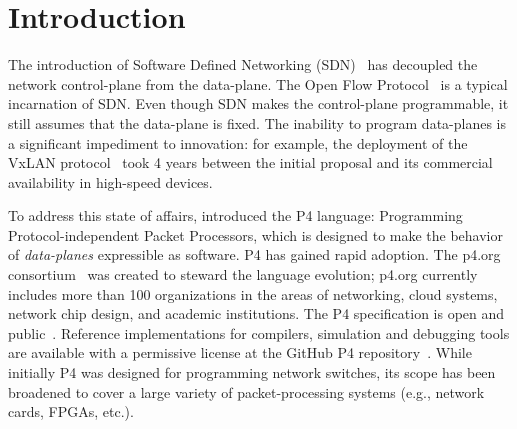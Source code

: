  \section{Introduction}\label{sec:introduction}

The introduction of Software Defined Networking (SDN)~\cite{rfc7426}
has decoupled the network control-plane from the data-plane.  The Open
Flow Protocol~\cite{mckeown-ccr08} is a typical incarnation of SDN.
Even though SDN makes the control-plane programmable, it still assumes
that the {data-plane} is fixed.  The inability to program data-planes
is a significant impediment to innovation: for example, the deployment
of the VxLAN protocol~\cite{rfc7348} took 4 years between the initial
proposal and its commercial availability in high-speed devices.

To address this state of affairs, \cite{bosshart-ccr14} introduced the
P4 language: Programming Protocol-independent Packet Processors, which
is designed to make the behavior of \emph{data-planes} expressible as
software.  P4 has gained rapid adoption.  The p4.org
consortium~\cite{p4org} was created to steward the language evolution;
p4.org currently includes more than 100 organizations in the areas of
networking, cloud systems, network chip design, and academic
institutions.  The P4 specification is open and
public~\cite{p416-spec17}. Reference implementations for compilers,
simulation and debugging tools are available with a permissive license
at the GitHub P4 repository~\cite{p4lang}. While initially P4 was
designed for programming network switches, its scope has been
broadened to cover a large variety of packet-processing systems (e.g.,
network cards, FPGAs, etc.).
